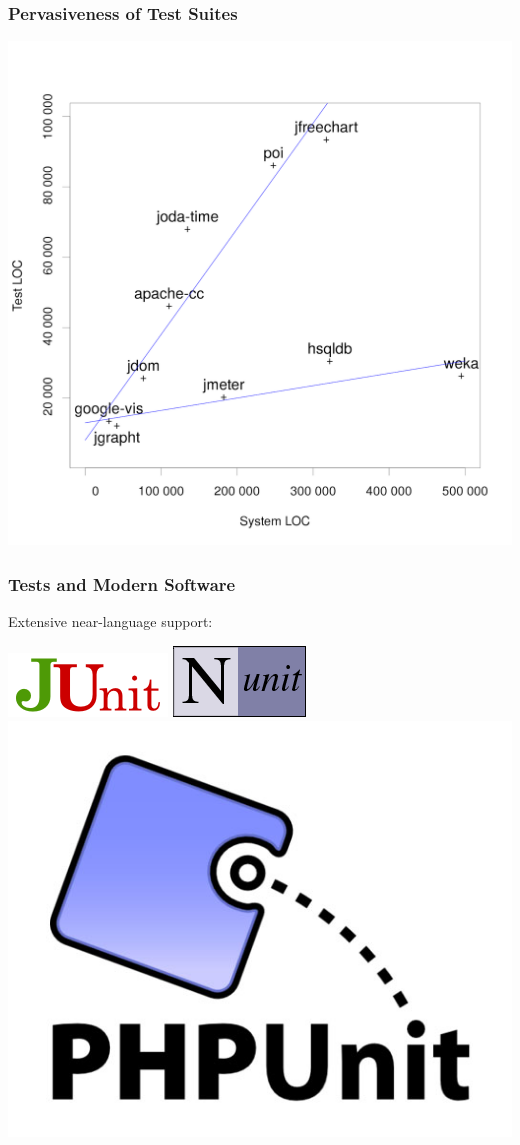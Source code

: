 \documentclass{beamer}
\begin{document}
\begin{frame}
  \frametitle{Pervasiveness of Test Suites}
\begin{center}
\includegraphics[width=\textwidth, height=.8\textheight, keepaspectratio=true]{images/test-vs-system.png}
\end{center}
\end{frame}

\begin{frame}
  \frametitle{Tests and Modern Software}
  Extensive near-language support:

\begin{center}
\includegraphics[width=.2\textwidth] {images/junit-logo.png} \hspace*{3em}
\includegraphics[width=.2\textwidth] {images/Nunit.png}  \hspace*{3em}
\includegraphics[width=.2\textwidth] {images/PHPUnit-logo.jpg}
\end{center}

\end{frame}
\end{document}
